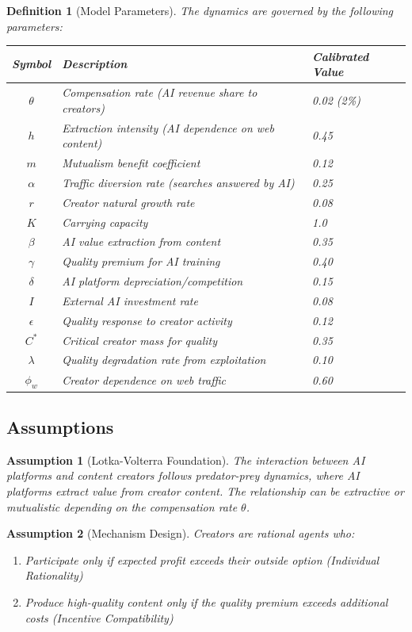 \documentclass[11pt,a4paper]{article}
\newtheorem{definition}{Definition}
\newtheorem{assumption}{Assumption}
\begin{document}
\begin{definition}[Model Parameters]
The dynamics are governed by the following parameters:
\begin{center}
\begin{tabular}{cll}
\toprule
Symbol & Description & Calibrated Value \\
\midrule
$\theta$ & Compensation rate (AI revenue share to creators) & 0.02 (2\%)\\
$h$ & Extraction intensity (AI dependence on web content) & 0.45\\
$m$ & Mutualism benefit coefficient & 0.12\\
$\alpha$ & Traffic diversion rate (searches answered by AI) & 0.25\\
$r$ & Creator natural growth rate & 0.08\\
$K$ & Carrying capacity & 1.0\\
$\beta$ & AI value extraction from content & 0.35\\
$\gamma$ & Quality premium for AI training & 0.40\\
$\delta$ & AI platform depreciation/competition & 0.15\\
$I$ & External AI investment rate & 0.08\\
$\epsilon$ & Quality response to creator activity & 0.12\\
$C^*$ & Critical creator mass for quality & 0.35\\
$\lambda$ & Quality degradation rate from exploitation & 0.10\\
$\phi_w$ & Creator dependence on web traffic & 0.60\\
\bottomrule
\end{tabular}
\end{center}
\end{definition}

\subsection{Assumptions}

\begin{assumption}[Lotka-Volterra Foundation]
The interaction between AI platforms and content creators follows predator-prey dynamics, where AI platforms extract value from creator content. The relationship can be extractive or mutualistic depending on the compensation rate $\theta$.
\end{assumption}

\begin{assumption}[Mechanism Design]
Creators are rational agents who:
\begin{enumerate}[label=(\alph*)]
\item Participate only if expected profit exceeds their outside option (Individual Rationality)
\item Produce high-quality content only if the quality premium exceeds additional costs (Incentive Compatibility)
\end{enumerate}
\end{assumption}
\end{document}
